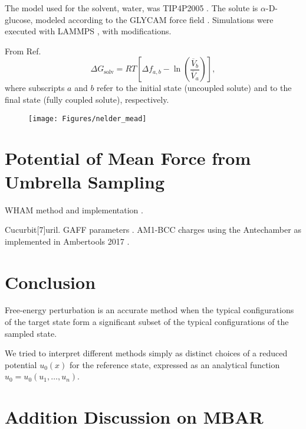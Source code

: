 \documentclass[journal=jctcce,manuscript=article,layout=twocolumn]{achemso}
\begin{document}
The model used for the solvent, water, was TIP4P2005 \cite{Abascal_2005}. The solute is $\alpha$-D-glucose, modeled according to the GLYCAM force field \cite{Kirschner_2007}. Simulations were executed with LAMMPS \cite{Plimpton_1995}, with modifications.



From Ref.~
\begin{equation*}
{\Delta G}_\text{solv} = RT \left[{\Delta f}_{a,b} - \ln \left(\frac{\overline{V}_b}{\overline{V}_a}\right)\right],
\end{equation*}
where subscripts $a$ and $b$ refer to the initial state (uncoupled solute) and to the final state (fully coupled solute), respectively. 

\begin{figure}
	\centering
	\texttt{[image: Figures/nelder\_mead]}
	\caption{}
	\label{fig:nelder_mead}
\end{figure}


\section{Potential of Mean Force from Umbrella Sampling}

WHAM method\cite{Kumar_1992} and implementation \cite{Grossfield}.

Cucurbit[7]uril. GAFF parameters \cite{Wang_2004}. AM1-BCC charges \cite{Jakalian_2000, *Jakalian_2002} using the Antechamber \cite{Wang_2006} as implemented in Ambertools 2017 \cite{Case_2017}.

\section{Conclusion}

Free-energy perturbation is an accurate method when the typical configurations of the target state form a significant subset of the typical configurations of the sampled state.

We tried to interpret different methods simply as distinct choices of a reduced potential $u_0(x)$ for the reference state, expressed as an analytical function $u_0 = u_0(u_1,\dots,u_n)$.

\appendix

\section{Addition Discussion on MBAR}
\label{sec:subsampling and uncertainty in MBAR}
\end{document}
